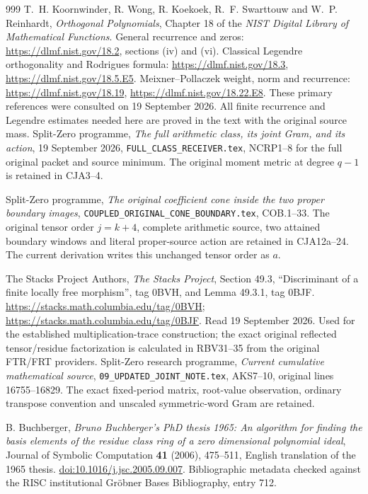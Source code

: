 \begin{thebibliography}{999}
T.~H. Koornwinder, R. Wong, R. Koekoek, R.~F. Swarttouw and
W.~P. Reinhardt, \emph{Orthogonal Polynomials}, Chapter 18 of the
\emph{NIST Digital Library of Mathematical Functions}.
General recurrence and zeros: \url{https://dlmf.nist.gov/18.2},
sections (iv) and (vi).
Classical Legendre orthogonality and Rodrigues formula:
\url{https://dlmf.nist.gov/18.3},
\url{https://dlmf.nist.gov/18.5.E5}.
Meixner--Pollaczek weight, norm and recurrence:
\url{https://dlmf.nist.gov/18.19},
\url{https://dlmf.nist.gov/18.22.E8}.
These primary references were consulted on 19 September 2026.
All finite recurrence and Legendre estimates needed here are
proved in the text with the original source mass.
Split-Zero programme,
\emph{The full arithmetic class, its joint Gram, and its action},
19 September 2026, \texttt{FULL\_CLASS\_RECEIVER.tex},
NCRP1--8 for the full original packet and source minimum.
The original moment metric at degree \(q-1\) is retained in CJA3--4.

Split-Zero programme,
\emph{The original coefficient cone inside the two proper boundary images},
\texttt{COUPLED\_ORIGINAL\_CONE\_BOUNDARY.tex}, COB.1--33.
The original tensor order \(j=k+4\), complete arithmetic source,
two attained boundary windows and literal proper-source action are
retained in CJA12a--24. The current derivation writes this unchanged
tensor order as \(a\).


The Stacks Project Authors, \emph{The Stacks Project},
Section 49.3, ``Discriminant of a finite locally free morphism'',
tag 0BVH, and Lemma 49.3.1, tag 0BJF.
\url{https://stacks.math.columbia.edu/tag/0BVH};
\url{https://stacks.math.columbia.edu/tag/0BJF}.
Read 19 September 2026. Used for the established multiplication-trace
construction; the exact original reflected tensor/residue factorization
is calculated in RBV31--35 from the original FTR/FRT providers.
Split-Zero research programme,
\emph{Current cumulative mathematical source},
\texttt{09\_UPDATED\_JOINT\_NOTE.tex}, AKS7--10,
original lines 16755--16829.
The exact fixed-period matrix, root-value observation, ordinary
transpose convention and unscaled symmetric-word Gram are retained.

B. Buchberger,
\emph{Bruno Buchberger's PhD thesis 1965:
An algorithm for finding the basis elements of the residue class ring
of a zero dimensional polynomial ideal},
Journal of Symbolic Computation \textbf{41} (2006), 475--511,
English translation of the 1965 thesis.
\href{https://doi.org/10.1016/j.jsc.2005.09.007}
{doi:10.1016/j.jsc.2005.09.007}.
Bibliographic metadata checked against the RISC institutional
Gr\"obner Bases Bibliography, entry 712.


\end{thebibliography}
